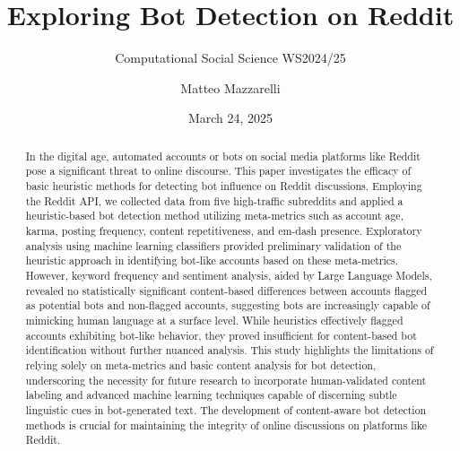 \documentclass[
  12pt,
  letterpaper,
  DIV=11,
  numbers=noendperiod,
  abstract]{scrartcl}
\title{Exploring Bot Detection on Reddit}
\subtitle{Computational Social Science WS2024/25}
\author{Matteo Mazzarelli}
\date{March 24, 2025}
\makeatletter
\renewcommand{\maketitle}{\bgroup\setlength{\parindent}{0pt}
\begin{flushleft}
  {\sffamily\huge\textbf{\MakeUppercase{\@title}}} \vspace{0.3cm} \newline
  {\Large {\@subtitle}} \newline
  \@author
\end{flushleft}\egroup
}
\makeatother
\begin{document}
\maketitle
\begin{abstract}
In the digital age, automated accounts or bots on social media platforms
like Reddit pose a significant threat to online discourse. This paper
investigates the efficacy of basic heuristic methods for detecting bot
influence on Reddit discussions. Employing the Reddit API, we collected
data from five high-traffic subreddits and applied a heuristic-based bot
detection method utilizing meta-metrics such as account age, karma,
posting frequency, content repetitiveness, and em-dash presence.
Exploratory analysis using machine learning classifiers provided
preliminary validation of the heuristic approach in identifying bot-like
accounts based on these meta-metrics. However, keyword frequency and
sentiment analysis, aided by Large Language Models, revealed no
statistically significant content-based differences between accounts
flagged as potential bots and non-flagged accounts, suggesting bots are
increasingly capable of mimicking human language at a surface level.
While heuristics effectively flagged accounts exhibiting bot-like
behavior, they proved insufficient for content-based bot identification
without further nuanced analysis. This study highlights the limitations
of relying solely on meta-metrics and basic content analysis for bot
detection, underscoring the necessity for future research to incorporate
human-validated content labeling and advanced machine learning
techniques capable of discerning subtle linguistic cues in bot-generated
text. The development of content-aware bot detection methods is crucial
for maintaining the integrity of online discussions on platforms like
Reddit.
\end{abstract}

\pagestyle{mystyle}


\end{document}
